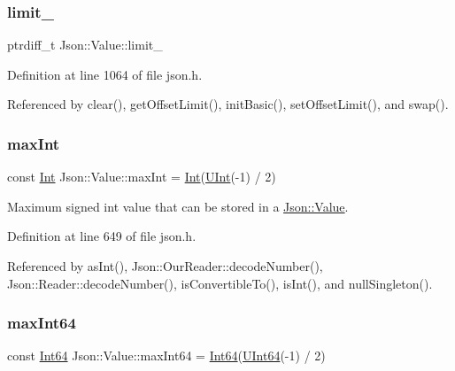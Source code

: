 \subsubsection{\texorpdfstring{limit\+\_\+}{limit\_}}
{\footnotesize\ttfamily ptrdiff\+\_\+t Json\+::\+Value\+::limit\+\_\+\hspace{0.3cm}{\ttfamily [private]}}



Definition at line 1064 of file json.\+h.



Referenced by clear(), get\+Offset\+Limit(), init\+Basic(), set\+Offset\+Limit(), and swap().

\mbox{\label{class_json_1_1_value_a978c799a8af3114ef7dab6fd0a310a1b}} 
\subsubsection{\texorpdfstring{max\+Int}{maxInt}}
{\footnotesize\ttfamily const \hyperlink{class_json_1_1_value_abdf7a7ff73eb130ffcab28504ffdb405}{Int} Json\+::\+Value\+::max\+Int = \hyperlink{class_json_1_1_value_abdf7a7ff73eb130ffcab28504ffdb405}{Int}(\hyperlink{class_json_1_1_value_a0933d59b45793ae4aade1757c322a98d}{U\+Int}(-\/1) / 2)\hspace{0.3cm}{\ttfamily [static]}}



Maximum signed int value that can be stored in a \hyperlink{class_json_1_1_value}{Json\+::\+Value}. 



Definition at line 649 of file json.\+h.



Referenced by as\+Int(), Json\+::\+Our\+Reader\+::decode\+Number(), Json\+::\+Reader\+::decode\+Number(), is\+Convertible\+To(), is\+Int(), and null\+Singleton().

\mbox{\label{class_json_1_1_value_a4492634870b8c5709ce967b384ac6006}} 
\subsubsection{\texorpdfstring{max\+Int64}{maxInt64}}
{\footnotesize\ttfamily const \hyperlink{class_json_1_1_value_a1b86af9f85f0f1baa972c3319fa22695}{Int64} Json\+::\+Value\+::max\+Int64 = \hyperlink{class_json_1_1_value_a1b86af9f85f0f1baa972c3319fa22695}{Int64}(\hyperlink{class_json_1_1_value_a8b62564be8c087c6d18de180ff4e13e3}{U\+Int64}(-\/1) / 2)\hspace{0.3cm}{\ttfamily [static]}}



